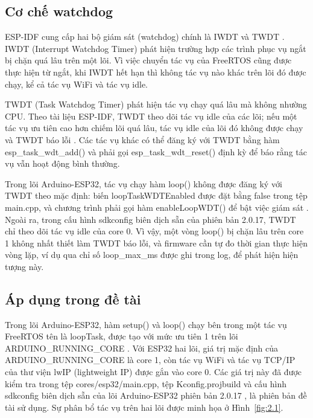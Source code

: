 \subsection{Cơ chế watchdog}

ESP-IDF cung cấp hai bộ giám sát (watchdog) chính là IWDT và TWDT \citep{espressif_wdts}. IWDT (Interrupt Watchdog Timer) phát hiện trường hợp các trình phục vụ ngắt bị chặn quá lâu trên một lõi. Vì việc chuyển tác vụ của FreeRTOS cũng được thực hiện từ ngắt, khi IWDT hết hạn thì không tác vụ nào khác trên lõi đó được chạy, kể cả tác vụ WiFi và tác vụ idle.

TWDT (Task Watchdog Timer) phát hiện tác vụ chạy quá lâu mà không nhường CPU. Theo tài liệu ESP-IDF, TWDT theo dõi tác vụ idle của các lõi; nếu một tác vụ ưu tiên cao hơn chiếm lõi quá lâu, tác vụ idle của lõi đó không được chạy và TWDT báo lỗi \citep{espressif_wdts}. Các tác vụ khác có thể đăng ký với TWDT bằng hàm esp\_task\_wdt\_add() và phải gọi esp\_task\_wdt\_reset() định kỳ để báo rằng tác vụ vẫn hoạt động bình thường.

Trong lõi Arduino-ESP32, tác vụ chạy hàm loop() không được đăng ký với TWDT theo mặc định: biến loopTaskWDTEnabled được đặt bằng false trong tệp main.cpp, và chương trình phải gọi hàm enableLoopWDT() để bật việc giám sát \citep{espressif_arduino_2017}. Ngoài ra, trong cấu hình sdkconfig biên dịch sẵn của phiên bản 2.0.17, TWDT chỉ theo dõi tác vụ idle của core 0. Vì vậy, một vòng loop() bị chặn lâu trên core 1 không nhất thiết làm TWDT báo lỗi, và firmware cần tự đo thời gian thực hiện vòng lặp, ví dụ qua chỉ số loop\_max\_ms được ghi trong log, để phát hiện hiện tượng này.


\subsection{Áp dụng trong đề tài}

Trong lõi Arduino-ESP32, hàm setup() và loop() chạy bên trong một tác vụ FreeRTOS tên là loopTask, được tạo với mức ưu tiên 1 trên lõi ARDUINO\_RUNNING\_CORE \citep{espressif_arduino_2017}. Với ESP32 hai lõi, giá trị mặc định của ARDUINO\_RUNNING\_CORE là core 1, còn tác vụ WiFi và tác vụ TCP/IP của thư viện lwIP (lightweight IP) được gắn vào core 0. Các giá trị này đã được kiểm tra trong tệp cores/esp32/main.cpp, tệp Kconfig.projbuild và cấu hình sdkconfig biên dịch sẵn của lõi Arduino-ESP32 phiên bản 2.0.17 \citep{espressif_arduino_2017}, là phiên bản đề tài sử dụng. Sự phân bổ tác vụ trên hai lõi được minh họa ở Hình~\ref{fig:2.1}.


